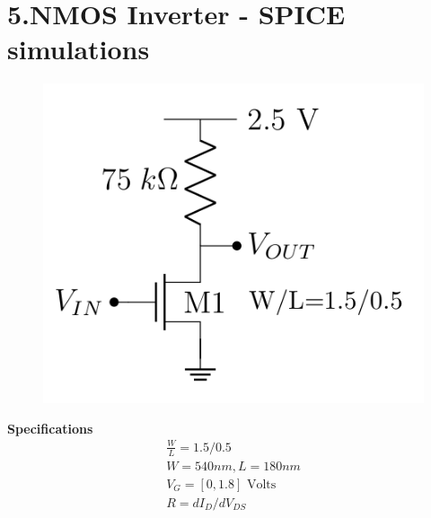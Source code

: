 \documentclass{article}
\begin{document}
\section{5.NMOS Inverter - SPICE simulations}
\begin{figure}[!ht]
    \centering
    \includegraphics[scale=0.5]{Images/5a.png}
\end{figure}
\textbf{Specifications}
\begin{align}
    \frac{W}{L} = 1.5/0.5\\
    W = 540nm, L = 180nm\\
    V_{G} = [0,1.8] \text{ Volts}\\
    R = dI_D/dV_{DS}
\end{align}
\end{document}
